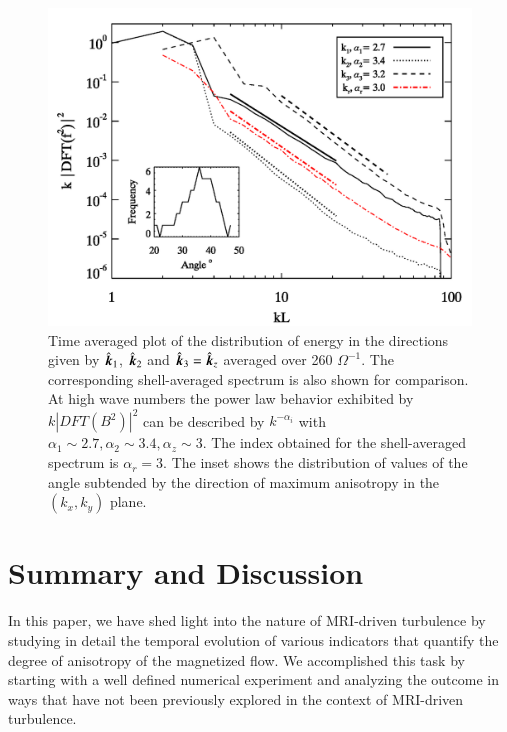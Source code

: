\documentclass[]{emulateapj}
\newcommand\bb[1]{\mbox{\boldmath{$#1$}}}
\begin{document}
\begin{figure}[t]
\begin{center}
\includegraphics[width= \columnwidth]{f18.png}
\caption{
Time averaged plot of the distribution of energy in the directions given by 
$\hat{\bb{k}}_1$, $\hat{\bb{k}}_2$ and $\hat{\bb{k}}_3=\hat{\bb{k}}_z$ 
averaged over 260 $\Omega^{-1}$. The corresponding shell-averaged
spectrum is also shown for comparison. At high wave numbers the power
law behavior exhibited by $k|DFT(B^2)|^2$ can be described 
by $k^{-\alpha_i}$ with 
$\alpha_1 \sim 2.7, \alpha_2 \sim 3.4,  \alpha_z \sim 3$.
The index obtained for the shell-averaged spectrum is $\alpha_r = 3$.
The inset shows the distribution of values of the angle subtended by the 
direction of maximum anisotropy in the $(k_x, k_y)$ plane.
}
\label{angle}
\end{center}
\end{figure}




\section{Summary and Discussion}
\label{discussion}

In this paper, we have shed light into the  nature of MRI-driven
turbulence by studying in detail the temporal evolution of various indicators
that quantify the degree of anisotropy of the magnetized flow. We accomplished 
this task by starting with a well defined numerical experiment and analyzing
the outcome in ways that have not been previously  explored in the
context of MRI-driven turbulence.
\end{document}
